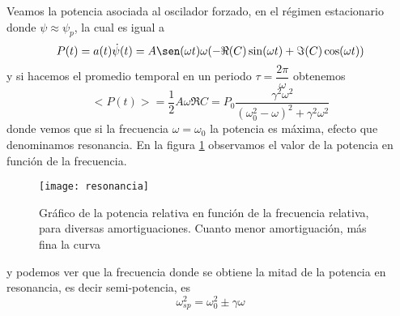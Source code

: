 \documentclass[a4paper]{article}
\numberwithin{equation}{section}
\begin{document}
	Veamos la potencia asociada al oscilador forzado, en el régimen estacionario donde $\psi \approx \psi_p$, la cual es igual a 
	\begin{equation}
		P(t) = a(t) \dot{\psi}(t) = A \sen(\omega t) \omega (- \Re(C) \sin(\omega t) + \Im(C) \cos(\omega t))
		\label{eq:oscilador_forzado_potencia_t}
	\end{equation}
	y si hacemos el promedio temporal en un periodo $\tau = \dfrac{2\pi}{\omega}$ obtenemos
	\begin{equation}
		<P(t)> = \frac{1}{2} A \omega \Re{C} = P_0  \frac{\gamma^2 \omega^2}{(\omega_0^2 - \omega)^2 + \gamma^2 \omega^2}
		\label{eq:oscilador_forzado_potencia_resonancia}
	\end{equation}
	donde vemos que si la frecuencia $\omega = \omega_0$ la potencia es máxima, efecto que denominamos resonancia. En la figura \ref{fig:resonancia} observamos el valor de la potencia en función de la frecuencia.
	\begin{figure}[H]
		\centering
		\texttt{[image: resonancia]}
		\caption{Gráfico de la potencia relativa en función de la frecuencia relativa, para diversas amortiguaciones. Cuanto menor amortiguación, más fina la curva}
		\label{fig:resonancia}
	\end{figure}
	y podemos ver que la frecuencia donde se obtiene la mitad de la potencia en resonancia, es decir semi-potencia, es 
	\begin{equation}
		\omega_{sp}^2 = \omega_0^2 \pm \gamma \omega
		\label{eq:oscilador_forzado_potencia_semipotencia}
	\end{equation}
	
\end{document}
